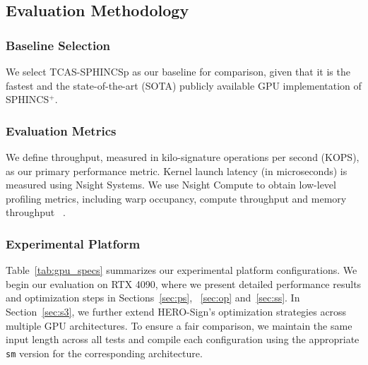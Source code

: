 \documentclass[10pt,conference]{IEEEtran}
\begin{document}
\subsection{Evaluation Methodology}
\subsubsection{Baseline Selection} We select TCAS-SPHINCSp as our baseline for comparison, given that it is the fastest and the state-of-the-art (SOTA) publicly available GPU implementation of SPHINCS$^+$\cite{kim2024parallel}.

\subsubsection{Evaluation Metrics}
We define throughput, measured in kilo-signature operations per second (KOPS), as our primary performance metric. Kernel launch latency (in microseconds) is measured using Nsight Systems. We use Nsight Compute to obtain low-level profiling metrics, including warp occupancy, compute throughput and memory throughput ~\cite{nsight_compute}.



\subsubsection{Experimental Platform}

Table~\ref{tab:gpu_specs} summarizes our experimental platform configurations. We begin our evaluation on RTX 4090, where we present detailed performance results and optimization steps in Sections~\ref{sec:ps}, ~\ref{sec:op} and~\ref{sec:ss}. In Section~\ref{sec:s3}, we further extend HERO-Sign’s optimization strategies across multiple GPU architectures. To ensure a fair comparison, we maintain the same input length across all tests and compile each configuration using the appropriate \texttt{sm} version for the corresponding architecture.
\end{document}
